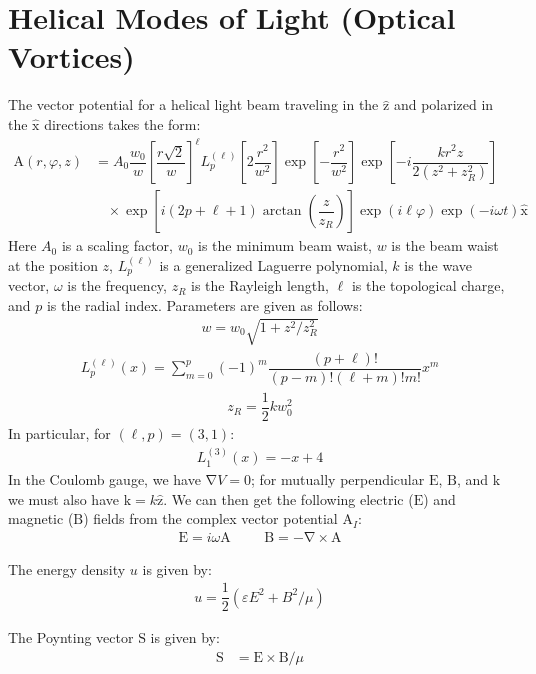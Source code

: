 \documentclass[10pt]{article}
\newcommand{\f}[2]{\dfrac{#1}{#2}} %
\newcommand{\p}[1]{\left(#1\right)} %
\renewcommand{\sp}[1]{\left[#1\right]} %
\renewcommand{\epsilon}{\varepsilon} %
\renewcommand{\phi}{\varphi} %
\renewcommand{\v}[1]{\boldsymbol{\mathrm{#1}}} %
\newcommand{\uv}[1]{\hat{\boldsymbol{\mathrm{#1}}}} %
\newcommand{\del}{\v\nabla} %
\begin{document}
\section*{Helical Modes of Light (Optical Vortices)}


The vector potential for a helical light beam traveling in the $\uv z$
and polarized in the $\uv x$ directions takes the form:
\begin{align*}
  \v A\p{r,\phi,z}&=A_0\f{w_0}{w}\sp{\f{r\sqrt 2}{w}}^\ell
  L^{\p{\ell}}_p\sp{2\f{r^2}{w^2}}\exp\sp{-\f{r^2}{w^2}}
  \exp\sp{-i\f{kr^2z}{2\p{z^2+z_R^2}}} \\
  &~~~~\times\exp\sp{i\p{2p+\ell+1}\arctan\p{\f z{z_R}}}
  \exp\p{i\ell\phi}\exp\p{-i\omega t} \uv x
\end{align*}
Here $A_0$ is a scaling factor, $w_0$ is the minimum beam waist, $w$
is the beam waist at the position $z$, $L^{\p{\ell}}_p$ is a
generalized Laguerre polynomial, $k$ is the wave vector, $\omega$ is
the frequency, $z_R$ is the Rayleigh length, $\ell$ is the topological
charge, and $p$ is the radial index. Parameters are given as follows:
\begin{align*}
  w=w_0\sqrt{1+z^2/z_R^2}
\end{align*}
\begin{align*}
  L^{\p{\ell}}_p\p{x}
  =\sum_{m=0}^p\p{-1}^m\f{\p{p+\ell}!}{\p{p-m}!\p{\ell+m}!m!}x^m
\end{align*}
\begin{align*}
  z_R=\f12 kw_0^2
\end{align*}
In particular, for $\p{\ell,p}=\p{3,1}$:
\begin{align*}
  L^{\p{3}}_1\p{x}=-x+4
\end{align*}
In the Coulomb gauge, we have $\del V=0$; for mutually perpendicular
$\v E$, $\v B$, and $\v k$ we must also have $\v k=k\uv z$. We can
then get the following electric ($\v E$) and magnetic ($\v B$) fields
from the complex vector potential $\v A_I$:
\begin{align*}
  \v E=i\omega\v A &&& \v B=-\del \times\v A
\end{align*}

The energy density $u$ is given by:
\begin{align*}
  u=\f12\p{\epsilon E^2+B^2/\mu} 
\end{align*}

The Poynting vector $\v S$ is given by:
\begin{align*}
  \v S&=\v E\times\v B/\mu 
\end{align*}
\end{document}
